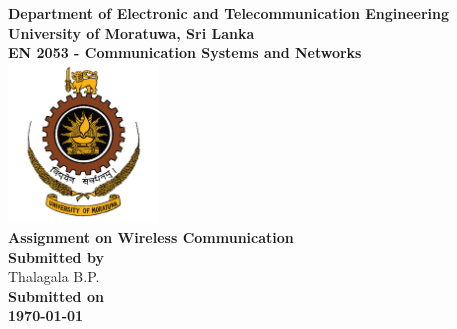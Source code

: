\begin{titlepage}
\center %

\textbf{\large Department of Electronic and Telecommunication Engineering}\\[0.5cm]
\textbf{\Large University of Moratuwa, Sri Lanka}\\[1cm]
\textbf{\large EN 2053 - Communication Systems and Networks}\\[2cm]
\includegraphics[width=0.3\textwidth]{figures/uomlogo}\\[2cm]

	
\textbf{\Huge Assignment on Wireless Communication}\\[6cm]



\textbf{\large Submitted by}\\[0.5cm]
{\large Thalagala B.P.} \hspace{1cm}{\large 180631J  }\\[1cm]

\textbf{\large Submitted on}\\[0.5cm]
\textbf{\Large \today} %


\vfill %

\end{titlepage}